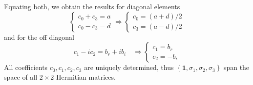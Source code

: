 \documentclass[../../../main.tex]{subfiles}
\begin{document}
Equating both, we obtain the results for diagonal elements
\begin{equation*}
    \begin{cases}
        c_0 + c_3 = a \\
        c_0 - c_3 = d
    \end{cases}
    \Rightarrow
    \begin{cases}
        c_0 = (a+d)/2 \\
        c_3 = (a-d)/2
    \end{cases}
\end{equation*}
and for the off diagonal
\begin{equation*}
    c_1 - i c_2 = b_r + i b_i
    \quad
    \Rightarrow
    \begin{cases}
        c_1 = b_r \\
        c_2 = -b_i
    \end{cases}
\end{equation*}
All coefficients $c_0, c_1, c_2, c_3$ are uniquely determined, thus $\left\{ \mathbf{1 },\sigma_1 ,\sigma_2,\sigma_3\right\} $ span the space of all $2 \times 2$ Hermitian matrices.
\end{document}
